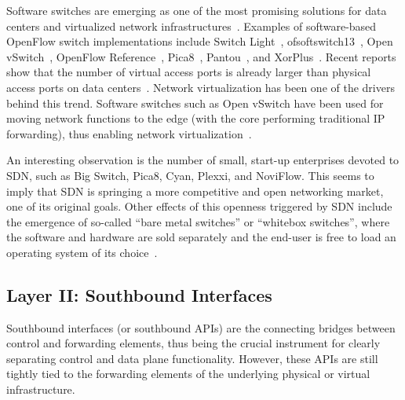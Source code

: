 Software switches are emerging as one of the most promising 
solutions for data centers and virtualized network infrastructures~\cite{weissberger2013,schenker2013,casado2013}.
Examples of software-based OpenFlow switch implementations include Switch Light~\cite{bigswitchnetworks2013}, ofsoftswitch13~\cite{cpqd2013}, Open vSwitch~\cite{listofcontributors2013}, OpenFlow Reference~\cite{openflowcommunity2009}, Pica8~\cite{pica8opennetworking2013-1}, Pantou~\cite{yiakoumis2011}, and XorPlus~\cite{shang2014}.
Recent reports show that the number of virtual access ports is already larger than physical access ports on data centers~\cite{casado2013}. 
Network virtualization has been one of the drivers behind this trend.
Software switches such as Open vSwitch have been used for moving network functions to the edge (with the core performing traditional IP forwarding), thus enabling network virtualization~\cite{koponen}.

An interesting observation is the number of small, start-up enterprises devoted to SDN, such as 
Big Switch, Pica8, Cyan, Plexxi, and NoviFlow. This seems to imply that SDN is springing a more competitive and open 
networking market, one of its original goals.
Other effects of this openness triggered by SDN include the emergence of so-called ``bare metal switches'' or ``whitebox switches'', where the software and hardware are sold separately and the end-user is free to load an operating system of its choice~\cite{onie2013}. 


\subsection{Layer II: Southbound Interfaces}
\label{sec:southboundAPIs}

Southbound interfaces (or southbound APIs) are the connecting bridges between control and forwarding 
elements, thus being the crucial instrument for clearly separating control and data plane functionality. However, 
these APIs are still tightly tied to the forwarding elements of the underlying physical or virtual 
infrastructure.

